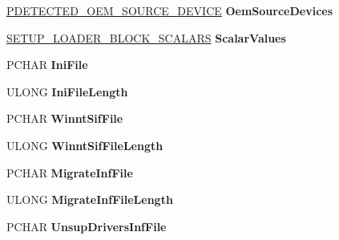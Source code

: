 \begin{DoxyCompactItemize}
\hyperlink{struct___d_e_t_e_c_t_e_d___o_e_m___s_o_u_r_c_e___d_e_v_i_c_e}{P\+D\+E\+T\+E\+C\+T\+E\+D\+\_\+\+O\+E\+M\+\_\+\+S\+O\+U\+R\+C\+E\+\_\+\+D\+E\+V\+I\+CE} {\bfseries Oem\+Source\+Devices}
\item 
\mbox{\label{struct___s_e_t_u_p___l_o_a_d_e_r___b_l_o_c_k_a701fef9605b283ea0f122dfa57574cef}} 
\hyperlink{struct___s_e_t_u_p___l_o_a_d_e_r___b_l_o_c_k___s_c_a_l_a_r_s}{S\+E\+T\+U\+P\+\_\+\+L\+O\+A\+D\+E\+R\+\_\+\+B\+L\+O\+C\+K\+\_\+\+S\+C\+A\+L\+A\+RS} {\bfseries Scalar\+Values}
\item 
\mbox{\label{struct___s_e_t_u_p___l_o_a_d_e_r___b_l_o_c_k_a6f6ab8bc23dc6552b4e26f422d6a26bb}} 
P\+C\+H\+AR {\bfseries Ini\+File}
\item 
\mbox{\label{struct___s_e_t_u_p___l_o_a_d_e_r___b_l_o_c_k_a9402b42819da037952a4f83b1faaafa4}} 
U\+L\+O\+NG {\bfseries Ini\+File\+Length}
\item 
\mbox{\label{struct___s_e_t_u_p___l_o_a_d_e_r___b_l_o_c_k_ae38d69722f17961ace2bd567e7510576}} 
P\+C\+H\+AR {\bfseries Winnt\+Sif\+File}
\item 
\mbox{\label{struct___s_e_t_u_p___l_o_a_d_e_r___b_l_o_c_k_ae1f3abfce5490e5f330ee189bfb31243}} 
U\+L\+O\+NG {\bfseries Winnt\+Sif\+File\+Length}
\item 
\mbox{\label{struct___s_e_t_u_p___l_o_a_d_e_r___b_l_o_c_k_a1c257c231158eda0c4ec616b23462d23}} 
P\+C\+H\+AR {\bfseries Migrate\+Inf\+File}
\item 
\mbox{\label{struct___s_e_t_u_p___l_o_a_d_e_r___b_l_o_c_k_a1fba771626383ca4cef38eefcec68521}} 
U\+L\+O\+NG {\bfseries Migrate\+Inf\+File\+Length}
\item 
\mbox{\label{struct___s_e_t_u_p___l_o_a_d_e_r___b_l_o_c_k_ae27e7c6e83c6c3a7023d4ff967e5e37f}} 
P\+C\+H\+AR {\bfseries Unsup\+Drivers\+Inf\+File}
\item 

\end{DoxyCompactItemize}
